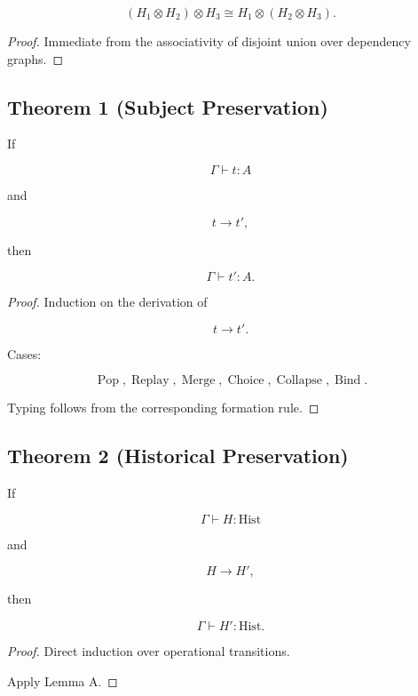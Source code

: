 \documentclass[12pt,oneside]{article}
\theoremstyle{definition}
\theoremstyle{remark}
\begin{document}
\[
(H_1\otimes H_2)\otimes H_3
\cong
H_1\otimes(H_2\otimes H_3).
\]

\begin{proof}

Immediate from the associativity of disjoint union over dependency graphs.

\end{proof}

\subsection*{Theorem 1 (Subject Preservation)}

If

\[
\Gamma
\vdash
t:A
\]

and

\[
t
\longrightarrow
t',
\]

then

\[
\Gamma
\vdash
t':A.
\]

\begin{proof}

Induction on the derivation of

\[
t
\longrightarrow
t'.
\]

Cases:

\[
\operatorname{Pop},
\operatorname{Replay},
\operatorname{Merge},
\operatorname{Choice},
\operatorname{Collapse},
\operatorname{Bind}.
\]

Typing follows from the corresponding formation rule.

\end{proof}

\subsection*{Theorem 2 (Historical Preservation)}

If

\[
\Gamma
\vdash
H:\mathrm{Hist}
\]

and

\[
H
\longrightarrow
H',
\]

then

\[
\Gamma
\vdash
H':\mathrm{Hist}.
\]

\begin{proof}

Direct induction over operational transitions.

Apply Lemma A.

\end{proof}
\end{document}
